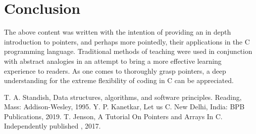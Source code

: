 \documentclass[two column, 10pt]{article}
\begin{document}
\section{Conclusion}
The above content was written with the intention of providing an in depth introduction to pointers, and perhaps more pointedly, their applications in the C programming language. Traditional methods of teaching were used in conjunction with abstract analogies in an attempt to bring a more effective learning experience to readers. As one comes to thoroughly grasp pointers, a deep understanding for the extreme flexibility of coding in C can be appreciated.

\newpage
\begin{thebibliography}{3} %
 T. A. Standish, Data structures, algorithms, and software principles. Reading, Mass: Addison-Wesley, 1995.
 Y. P. Kanetkar, Let us C. New Delhi, India: BPB Publications, 2019.
 T. Jenson, A Tutorial On Pointers and Arrays In C. Independently published , 2017.
\end{thebibliography}
\end{document}
